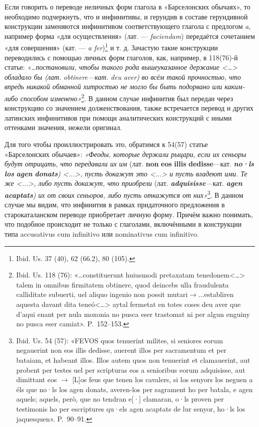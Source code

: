 Если говорить о переводе неличных форм глагола в «Барселонских обычаях», то необходимо подчеркнуть, что и инфинитивы, и герундив в составе герундивной конструкции заменяются инфинитивом соответствующего глагола с предлогом \emph{a}, например форма «для осуществления» (лат. --- \emph{faciendam}) передаётся сочетанием «для совершения» (кат. --- \emph{a fer})\footnote{Ibid. Us. 37 (40), 62 (66.2), 80 (105).} и т. д. Зачастую такие конструкции переводились с помощью личных форм глаголов, как, например, в 118(76)-й статье: \emph{«…постановили, чтобы такого рода вышеуказанное держание <…> обладало бы (лат. }\emph{obtinere}\emph{---кат. }\emph{deu}\emph{ }\emph{aver}\emph{)}\emph{ во всём такой прочностью, что впредь никакой обманной хитростью не могло бы быть подорвано или каким-либо способом изменено»}\footnote{Ibid. Us. 118 (76): «…constituerunt huiusmodi pretaxatam tenedonem<…> talem in omnibus firmitatem obtinere, quod deincebs ulla fraudulenta calliditate subuerti, uel aliquo ingenio non possit mutari$\rightarrow$...establiren aquesta davant dita teneó<…> aytal fermetat en totes coses deu aver que d’aqui enant per nula moxonia no pusca eser trastomat ni per algun enguiny no pusca eser camiat». P.~152--153.}. В данном случае инфинитив был передан через конструкцию со значением долженствования, также встречается перевод и других латинских инфинитивов при помощи аналитических конструкций с иными оттенками значения, нежели оригинал.

Для того чтобы проиллюстрировать это, обратимся к 54(57) статье «Барселонских обычаев»: \emph{«Феоды, которые держали рыцари, }\emph{если их сеньоры будут отрицать, что передавали их им }(лат.\emph{ }\textbf{non}\textbf{ }\textbf{eos}\textbf{ }\textbf{illis}\textbf{ }\textbf{dedisse}---кат.\textbf{\emph{ }}\textbf{\emph{no}}\textbf{\emph{·}}\textbf{\emph{ls}}\textbf{\emph{ }}\textbf{\emph{los}}\textbf{\emph{ }}\textbf{\emph{agen}}\textbf{\emph{ }}\textbf{\emph{donats}}\emph{) <...>, пусть докажут это <...> и пусть владеют ими. Те же <...>, либо пусть докажут, что приобрели} (лат. \textbf{\emph{adquisisse}}\emph{---}кат.\emph{ }\textbf{\emph{agen}}\textbf{\emph{ }}\textbf{\emph{acaptats}}\emph{) их от своих сеньоров, либо пусть откажутся от них»}\footnote{Ibid. Us. 54 (57): «FEVOS quos tenuerint milites, si seniores eorum negauerint non eos illis dedisse, auerent illos per sacramentum et per bataiam, et habeant illos. Illos autem quos non tenuerint et clamauerint, aut probent per testes uel per scripturas eos a senioribus eorum adquisisse, aut dimittant eos $\rightarrow$ [L]os feus que tenen los cavalers, si los senyors los neguen a éls que no·ls los agen donats, averen-los per sagrament ho per batala, e agen aquels; aquels, però, que no tendran e[·] clamaran, o·ls proven per testimonis ho per escriptures qu·els agen acaptats de lur senyor, ho·ls los jaquesquen». P.~90--91.}. В данном случае мы видим, что инфинитив в рамках придаточного предложения в старокаталанском переводе приобретает личную форму. Причём важно понимать, что подобное происходит не только с глаголами, включёнными в конструкции типа accusativus cum infinitivo или nominativus cum infinitivo.


